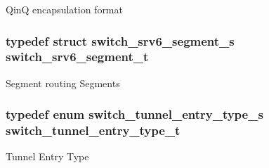 Qin\+Q encapsulation format \hypertarget{group__Tunnel_ga58531f8a8bab6f7c34f9bd77c243ec2f}{
\subsubsection[{switch\+\_\+srv6\+\_\+segment\+\_\+t}]{\setlength{\rightskip}{0pt plus 5cm}typedef struct {\bf switch\+\_\+srv6\+\_\+segment\+\_\+s}  {\bf switch\+\_\+srv6\+\_\+segment\+\_\+t}}}\label{group__Tunnel_ga58531f8a8bab6f7c34f9bd77c243ec2f}
Segment routing Segments \hypertarget{group__Tunnel_ga8c691aa3424f01425814cccd5c076e44}{
\subsubsection[{switch\+\_\+tunnel\+\_\+entry\+\_\+type\+\_\+t}]{\setlength{\rightskip}{0pt plus 5cm}typedef enum {\bf switch\+\_\+tunnel\+\_\+entry\+\_\+type\+\_\+s}  {\bf switch\+\_\+tunnel\+\_\+entry\+\_\+type\+\_\+t}}}\label{group__Tunnel_ga8c691aa3424f01425814cccd5c076e44}
Tunnel Entry Type 

